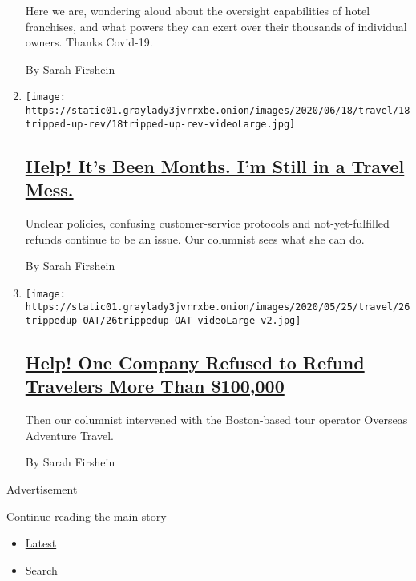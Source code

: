 \begin{enumerate}
  Here we are, wondering aloud about the oversight capabilities of hotel
  franchises, and what powers they can exert over their thousands of
  individual owners. Thanks Covid-19.

  By Sarah Firshein
\item
  \texttt{[image: https://static01.graylady3jvrrxbe.onion/images/2020/06/18/travel/18tripped-up-rev/18tripped-up-rev-videoLarge.jpg]}

  \hypertarget{help-its-been-months-im-still-in-a-travel-mess}{%
  \subsection{\texorpdfstring{\href{/2020/06/18/travel/travel-refunds-airlines.html}{Help!
  It's Been Months. I'm Still in a Travel
  Mess.}}{Help! It's Been Months. I'm Still in a Travel Mess.}}\label{help-its-been-months-im-still-in-a-travel-mess}}

  Unclear policies, confusing customer-service protocols and
  not-yet-fulfilled refunds continue to be an issue. Our columnist sees
  what she can do.

  By Sarah Firshein
\item
  \texttt{[image: https://static01.graylady3jvrrxbe.onion/images/2020/05/25/travel/26trippedup-OAT/26trippedup-OAT-videoLarge-v2.jpg]}

  \hypertarget{help-one-company-refused-to-refund-travelers-more-than-100000}{%
  \subsection{\texorpdfstring{\href{/2020/05/25/travel/coronavirus-refunds-overseas-adventure-travel.html}{Help!
  One Company Refused to Refund Travelers More Than
  \$100,000}}{Help! One Company Refused to Refund Travelers More Than \$100,000}}\label{help-one-company-refused-to-refund-travelers-more-than-100000}}

  Then our columnist intervened with the Boston-based tour operator
  Overseas Adventure Travel.

  By Sarah Firshein
\end{enumerate}

Advertisement

\protect\hyperlink{after-mid2}{Continue reading the main story}

\begin{itemize}
\tightlist
\item
  \protect\hyperlink{stream-panel}{Latest}
\item
  Search
\end{itemize}

